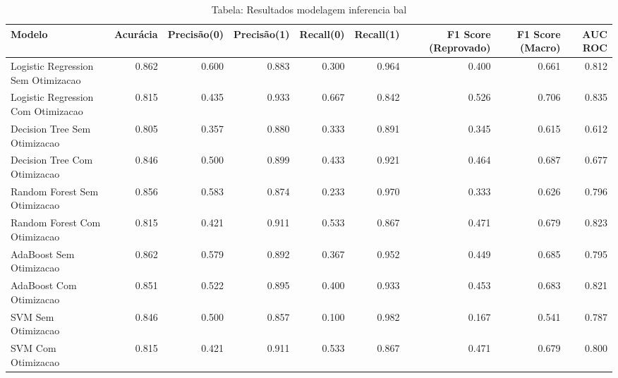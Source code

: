 \begin{table}[H] %
    \centering
    \caption{Tabela: Resultados modelagem inferencia bal}
    \label{tab:resultados_modelagem_inferencia_bal}
    \renewcommand{\arraystretch}{1.25} %
    \begin{adjustwidth}{ -1in }{ -1in } %
    \centering %
    \small %
    \begin{tabular}{lrrrrrrrr}
\toprule
                            Modelo &  Acurácia &  Precisão(0) &  Precisão(1) &  Recall(0) &  Recall(1) &  F1 Score (Reprovado) &  F1 Score (Macro) &  AUC ROC \\
\midrule
Logistic Regression Sem Otimizacao &     0.862 &        0.600 &        0.883 &      0.300 &      0.964 &                 0.400 &             0.661 &    0.812 \\
Logistic Regression Com Otimizacao &     0.815 &        0.435 &        0.933 &      0.667 &      0.842 &                 0.526 &             0.706 &    0.835 \\
      Decision Tree Sem Otimizacao &     0.805 &        0.357 &        0.880 &      0.333 &      0.891 &                 0.345 &             0.615 &    0.612 \\
      Decision Tree Com Otimizacao &     0.846 &        0.500 &        0.899 &      0.433 &      0.921 &                 0.464 &             0.687 &    0.677 \\
      Random Forest Sem Otimizacao &     0.856 &        0.583 &        0.874 &      0.233 &      0.970 &                 0.333 &             0.626 &    0.796 \\
      Random Forest Com Otimizacao &     0.815 &        0.421 &        0.911 &      0.533 &      0.867 &                 0.471 &             0.679 &    0.823 \\
           AdaBoost Sem Otimizacao &     0.862 &        0.579 &        0.892 &      0.367 &      0.952 &                 0.449 &             0.685 &    0.795 \\
           AdaBoost Com Otimizacao &     0.851 &        0.522 &        0.895 &      0.400 &      0.933 &                 0.453 &             0.683 &    0.821 \\
                SVM Sem Otimizacao &     0.846 &        0.500 &        0.857 &      0.100 &      0.982 &                 0.167 &             0.541 &    0.787 \\
                SVM Com Otimizacao &     0.815 &        0.421 &        0.911 &      0.533 &      0.867 &                 0.471 &             0.679 &    0.800 \\
\bottomrule
\end{tabular}
    \end{adjustwidth}
    \renewcommand{\arraystretch}{1.0} %
\end{table}
